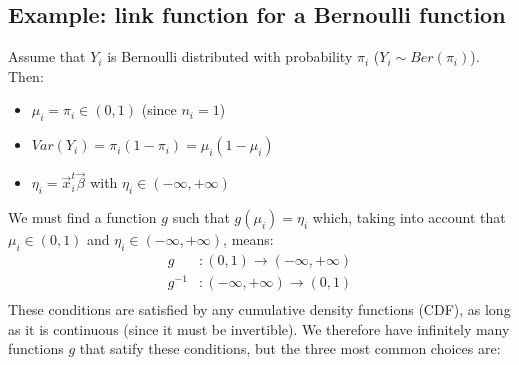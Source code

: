     \subsection{Example: link function for a Bernoulli function}
      Assume that $Y_i$ is Bernoulli distributed with probability $\pi_i$ ($Y_i \sim Ber(\pi_i)$). Then:
      \begin{itemize}
        \item $\mu_i = \pi_i \in (0,1)$ (since $n_i = 1$)
        \item $Var(Y_i) = \pi_i(1-\pi_i) = \mu_i(1-\mu_i)$
        \item $\eta_i = \vec{x}_i^t\vec{\beta}$ with $\eta_i \in (-\infty, +\infty)$
      \end{itemize}
      We must find a function $g$ such that $g(\mu_i)=\eta_i$ which, taking into account that $\mu_i \in (0, 1)$ and $\eta_i \in (-\infty, +\infty)$, means:
      \begin{align*}
        g&: (0, 1) \to (-\infty, +\infty) \\
        g^{-1}&: (-\infty, +\infty) \to (0, 1)  \\
      \end{align*}
      These conditions are satisfied by any cumulative density functions (CDF), as long as it is continuous (since it must be invertible).
      We therefore have infinitely many functions $g$ that satify these conditions, but the three most common choices are:
